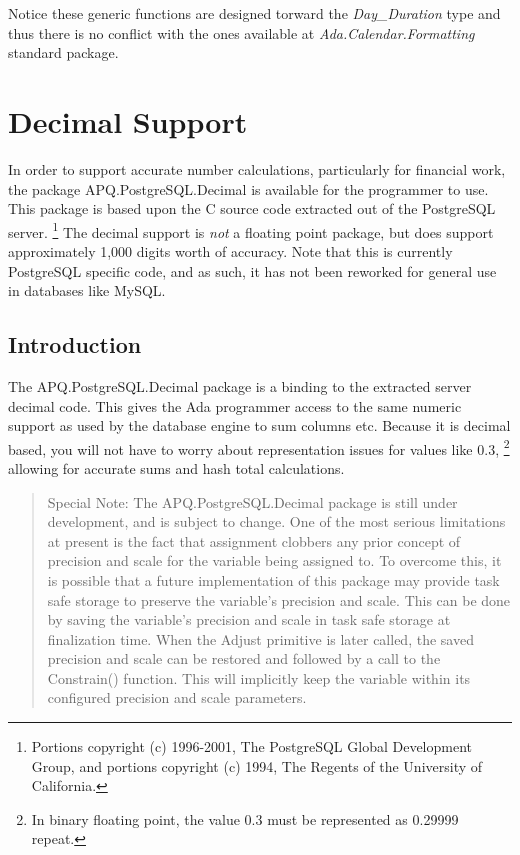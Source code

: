 \documentclass[english,letterpaper]{book}
\begin{document}
Notice these generic functions are designed torward the \emph{Day\_Duration} type and thus there is
no conflict with the ones available at \emph{Ada.Calendar.Formatting} standard package.

\chapter{Decimal Support}

In order to support accurate number calculations, particularly for
financial work, the package APQ\-.PostgreSQL\-.Decimal
is available for the programmer to use. This package is based upon
the C source code extracted out of the PostgreSQL server.%
\footnote{Portions copyright (c) 1996-2001, The PostgreSQL Global Development
Group, and portions copyright (c) 1994, The Regents of the University
of California.%
} The decimal support is \emph{not} a floating
point package, but does support approximately
1,000 digits worth of accuracy. Note that this is currently PostgreSQL
specific code, and as such, it has not been reworked for general use
in databases like MySQL.


\section{Introduction}

The APQ\-.PostgreSQL\-.Decimal package is a binding to the extracted server
decimal code. This gives the Ada programmer access to the same numeric
support as used by the database engine to
sum columns etc. Because it is decimal based, you will not have to
worry about representation issues for values like 0.3,%
\footnote{In binary floating point, the value 0.3 must be represented as 0.29999
repeat.} allowing for accurate sums and hash total calculations.


\begin{quote}
Special Note: The APQ\-.PostgreSQL\-.Decimal package is still under development,
and is subject to change. One of the most serious limitations at present
is the fact that assignment clobbers any prior concept of precision
and scale for the variable being assigned to. To overcome this, it
is possible that a future implementation of this package may provide
task safe storage to preserve the variable's precision and scale.
This can be done by saving the variable's precision and scale in task
safe storage at finalization time. When the Adjust primitive is later
called, the saved precision and scale can be restored and followed
by a call to the Constrain() function. This will implicitly keep the
variable within its configured precision and scale parameters.
\end{quote}
\end{document}

